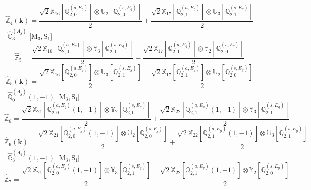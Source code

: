 \documentclass[fleqn,10pt,landscape]{article}
\begin{document}
\begin{itemize}
\begin{dmath*}
\end{dmath*}
\begin{dmath*}
\hat{\mathbb{Z}}_{4}(\bm{k})=\frac{\sqrt{2} \mathbb{X}_{16}[\mathbb{Q}_{2,0}^{(a,E_{g})}] \otimes\mathbb{U}_{2}[\mathbb{Q}_{2,0}^{(s,E_{g})}]}{2} + \frac{\sqrt{2} \mathbb{X}_{17}[\mathbb{Q}_{2,1}^{(a,E_{g})}] \otimes\mathbb{U}_{3}[\mathbb{Q}_{2,1}^{(s,E_{g})}]}{2}
\end{dmath*}
\vspace{4mm}
\noindent {} $\,\,\,\hat{\mathbb{G}}_{3}^{(A_{g})}$ [M$_{3}$,\,S$_{1}$]
\begin{dmath*}
\hat{\mathbb{Z}}_{5}=\frac{\sqrt{2} \mathbb{X}_{16}[\mathbb{Q}_{2,0}^{(a,E_{g})}] \otimes\mathbb{Y}_{3}[\mathbb{Q}_{2,1}^{(s,E_{g})}]}{2} - \frac{\sqrt{2} \mathbb{X}_{17}[\mathbb{Q}_{2,1}^{(a,E_{g})}] \otimes\mathbb{Y}_{2}[\mathbb{Q}_{2,0}^{(s,E_{g})}]}{2}
\end{dmath*}
\begin{dmath*}
\hat{\mathbb{Z}}_{5}(\bm{k})=\frac{\sqrt{2} \mathbb{X}_{16}[\mathbb{Q}_{2,0}^{(a,E_{g})}] \otimes\mathbb{U}_{3}[\mathbb{Q}_{2,1}^{(s,E_{g})}]}{2} - \frac{\sqrt{2} \mathbb{X}_{17}[\mathbb{Q}_{2,1}^{(a,E_{g})}] \otimes\mathbb{U}_{2}[\mathbb{Q}_{2,0}^{(s,E_{g})}]}{2}
\end{dmath*}
\vspace{4mm}
\noindent {} $\,\,\,\hat{\mathbb{Q}}_{0}^{(A_{g})}(1,-1)$ [M$_{3}$,\,S$_{1}$]
\begin{dmath*}
\hat{\mathbb{Z}}_{6}=\frac{\sqrt{2} \mathbb{X}_{21}[\mathbb{Q}_{2,0}^{(a,E_{g})}(1,-1)] \otimes\mathbb{Y}_{2}[\mathbb{Q}_{2,0}^{(s,E_{g})}]}{2} + \frac{\sqrt{2} \mathbb{X}_{22}[\mathbb{Q}_{2,1}^{(a,E_{g})}(1,-1)] \otimes\mathbb{Y}_{3}[\mathbb{Q}_{2,1}^{(s,E_{g})}]}{2}
\end{dmath*}
\begin{dmath*}
\hat{\mathbb{Z}}_{6}(\bm{k})=\frac{\sqrt{2} \mathbb{X}_{21}[\mathbb{Q}_{2,0}^{(a,E_{g})}(1,-1)] \otimes\mathbb{U}_{2}[\mathbb{Q}_{2,0}^{(s,E_{g})}]}{2} + \frac{\sqrt{2} \mathbb{X}_{22}[\mathbb{Q}_{2,1}^{(a,E_{g})}(1,-1)] \otimes\mathbb{U}_{3}[\mathbb{Q}_{2,1}^{(s,E_{g})}]}{2}
\end{dmath*}
\vspace{4mm}
\noindent {} $\,\,\,\hat{\mathbb{G}}_{3}^{(A_{g})}(1,-1)$ [M$_{3}$,\,S$_{1}$]
\begin{dmath*}
\hat{\mathbb{Z}}_{7}=\frac{\sqrt{2} \mathbb{X}_{21}[\mathbb{Q}_{2,0}^{(a,E_{g})}(1,-1)] \otimes\mathbb{Y}_{3}[\mathbb{Q}_{2,1}^{(s,E_{g})}]}{2} - \frac{\sqrt{2} \mathbb{X}_{22}[\mathbb{Q}_{2,1}^{(a,E_{g})}(1,-1)] \otimes\mathbb{Y}_{2}[\mathbb{Q}_{2,0}^{(s,E_{g})}]}{2}

\end{dmath*}
\end{itemize}
\end{document}

